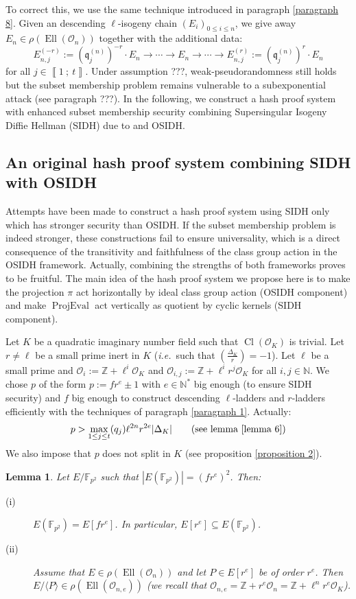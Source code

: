\documentclass[a4paper,10pt]{report}
\theoremstyle{definition}
\theoremstyle{plain}
\newtheorem{lemma}[definition]{Lemma}
\theoremstyle{definition}
\newcommand{\ie}{\emph{i.e.}\ }
\newcommand{\N}{\mathbb{N}}
\newcommand{\Z}{\mathbb{Z}}
\newcommand{\F}{\mathbb{F}}
\newcommand{\mO}{\mathcal{O}}
\renewcommand{\i}[2]{\left\llbracket #1~;~#2\right\rrbracket}
\renewcommand{\(}{\left(}
\renewcommand{\)}{\right)}
\newcommand{\mf}[1]{\mathfrak{#1}}
\DeclareMathOperator{\Cl}{Cl}
\DeclareMathOperator{\Ell}{Ell}
\DeclareMathOperator{\ProjEval}{ProjEval}
\begin{document}
To correct this, we use the same technique introduced in paragraph \ref{paragraph 8}. Given an descending $\ell$-isogeny chain $(E_i)_{0\leq i\leq n}$, we give away $E_n\in\rho(\Ell(\mO_n))$ together with the additional data:
\[E_{n,j}^{(-r)}:=(\mf{q}_j^{(n)})^{-r}\cdot E_n\longrightarrow \cdots \longrightarrow E_{n}\longrightarrow \cdots\longrightarrow E_{n,j}^{(r)}:=(\mf{q}_j^{(n)})^{r}\cdot E_n\]
for all $j\in\i{1}{t}$. Under assumption ???, weak-pseudorandomness still holds but the subset membership problem remains vulnerable to a subexponential attack (see paragraph ???). In the following, we construct a hash proof system with enhanced subset membership security combining Supersingular Isogeny Diffie Hellman (SIDH) due to \cite{DeFeoSIDH} and OSIDH.

\subsection{An original hash proof system combining SIDH with OSIDH}

Attempts have been made to construct a hash proof system using SIDH only which has stronger security than OSIDH. If the subset membership problem is indeed stronger, these constructions fail to ensure universality, which is a direct consequence of the transitivity and faithfulness of the class group action in the OSIDH framework.  Actually, combining the strengths of both frameworks proves to be fruitful.  The main idea of the hash proof system we propose here is to make the projection $\pi$ act horizontally by ideal class group action (OSIDH component) and make $\ProjEval$ act vertically as quotient by cyclic kernels (SIDH component).   

Let $K$ be a quadratic imaginary number field such that $\Cl(\mO_K)$ is trivial.  Let $r\neq \ell$ be a small prime inert in $K$ (\ie such that $\(\frac{\Delta_K}{r}\)=-1$). Let $\ell$ be a small prime and $\mO_i:=\Z+\ell^i\mO_K$ and $\mO_{i,j}:=\Z+\ell^ir^j\mO_K$ for all $i, j\in\N$. We chose $p$ of the form $p:=f r^e\pm 1$ with $e\in\N^*$ big enough (to ensure SIDH security) and $f$ big enough to construct descending $\ell$-ladders and $r$-ladders efficiently with the techniques of paragraph \ref{paragraph 1}. Actually:
\[p>\max_{1\leq j\leq t}(q_j)\ell^{2n}r^{2e}|\Delta_K|\qquad (\mbox{see lemma \ref{lemma 6}})\]
We also impose that $p$ does not split in $K$ (see proposition \ref{proposition 2}). 

\begin{lemma}\label{lemma 7}
Let $E/\F_{p^2}$ such that $|E(\F_{p^2})|=(f r^e)^2$. Then:
\begin{description}
\item[(i)] $E(\F_{p^2})=E[fr^e]$. In particular, $E[r^e]\subseteq E(\F_{p^2})$.
\item[(ii)] Assume that $E\in\rho(\Ell(\mO_n))$ and let $P\in E[r^e]$ be of order $r^e$. Then $E/\langle P\rangle\in \rho(\Ell(\mO_{n,e}))$ (we recall that $\mO_{n,e}=\Z+r^e\mO_n=\Z+\ell^n r^e\mO_K$).
\end{description}
\end{lemma}
\end{document}
